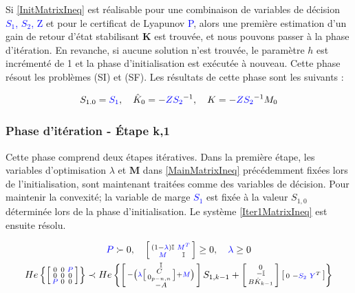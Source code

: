 Si \eqref{InitMatrixIneq} est réalisable pour une combinaison de variables de décision \textcolor{blue}{$S_1$, $S_2$, Z} et pour le certificat de Lyapunov \textcolor{blue}{P}, alors une première estimation d'un gain de retour d'état stabilisant $\boldsymbol{K}$ est trouvée, et nous pouvons passer à la phase d'itération. En revanche, si aucune solution n'est trouvée, le paramètre $h$ est incrémenté de 1 et la phase d'initialisation est exécutée à nouveau. Cette phase résout les problèmes (SI) et (SF). Les résultats de cette phase sont les suivants :

\begin{equation}
    \begin{gathered}
        S_{1.0}=\textcolor{blue}{S_1},  \quad
        \hat{K}_0 = -\textcolor{blue}{Z} \textcolor{blue}{S_2}^{-1}, \quad
        K = -\textcolor{blue}{Z} \textcolor{blue}{S_2}^{-1} M_0
    \end{gathered}
    \label{OutputsInit}
\end{equation}

\subsubsection{Phase d'itération - Étape k,1}

Cette phase comprend deux étapes itératives. Dans la première étape, les variables d'optimisation $\lambda$ et $\boldsymbol{M}$ dans \ref{MainMatrixIneq} précédemment fixées lors de l'initialisation, sont maintenant traitées comme des variables de décision. Pour maintenir la convexité; la variable de marge \textcolor{blue}{$S_1$} est fixée à la valeur $S_{1,0}$ déterminée lors de la phase d'initialisation. Le système \eqref{Iter1MatrixIneq} est ensuite résolu.

\begin{equation}
\centering
    \begin{gathered}
        \textcolor{blue}{P} \succ 0, \quad \smallmat{
            (1-\textcolor{blue}{\lambda})\mathbb{I} & \textcolor{blue}{M^T}\\
            \textcolor{blue}{M} & \mathbb{I}
        } \geq 0 ,\quad \textcolor{blue}{\lambda} \geq 0 \\
        He\left\{ \smallmat{
            0 & 0 & \textcolor{blue}{P}\\
            0 & 0 & 0\\
            \textcolor{blue}{P} & 0 & 0
        }\right\}
    \prec
    He\left\{\smallmat{
            \mathbb{I}\\
            -\left( \textcolor{blue}{\lambda}
            \smallmat{
                C\\
                0_{p-n,n}
             } +
            \textcolor{blue}{M}
            \right) \\
            -A
    }
    S_{1,k-1} +
    \smallmat{
         0\\
        -\mathbb{I}\\
        B \hat{K}_{k-1}
    }
    \smallmat{
        0 & -\textcolor{blue}{S_2} & \textcolor{blue}{Y}^T
    }\right\}
    \end{gathered}
    \label{Iter1MatrixIneq}
\end{equation}

